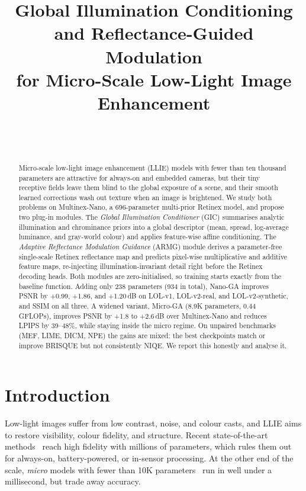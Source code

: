 \documentclass[10pt,twocolumn,letterpaper]{article}
\title{Global Illumination Conditioning and Reflectance-Guided Modulation\\for Micro-Scale Low-Light Image Enhancement}
\author{\todo{Author names} \\ \todo{Affiliation} \\ {\tt\small \todo{email}}}
\date{}
\begin{document}
\maketitle

\begin{abstract}
Micro-scale low-light image enhancement (LLIE) models with fewer than ten thousand
parameters are attractive for always-on and embedded cameras, but their tiny
receptive fields leave them blind to the global exposure of a scene, and their
smooth learned corrections wash out texture when an image is brightened. We study
both problems on Multinex-Nano, a 696-parameter multi-prior Retinex model, and propose
two plug-in modules. The \emph{Global Illumination Conditioner} (GIC) summarises
analytic illumination and chrominance priors into a global descriptor (mean,
spread, log-average luminance, and gray-world colour) and applies feature-wise
affine conditioning. The \emph{Adaptive Reflectance Modulation Guidance} (ARMG) module
derives a parameter-free single-scale Retinex reflectance map and predicts
pixel-wise multiplicative and additive feature maps, re-injecting
illumination-invariant detail right before the Retinex decoding heads. Both
modules are zero-initialised, so training starts exactly from the baseline
function. Adding only 238 parameters (934 in total), Nano-GA improves PSNR by
+0.99, +1.86, and +1.20\,dB on LOL-v1, LOL-v2-real, and LOL-v2-synthetic, and SSIM
on all three. A widened variant, Micro-GA (8.9K parameters, 0.44\,GFLOPs), improves
PSNR by +1.8 to +2.6\,dB over Multinex-Nano and reduces LPIPS by 39--48\%,
while staying inside the micro regime. On unpaired benchmarks (MEF, LIME, DICM, NPE)
the gains are mixed: the best checkpoints match or improve BRISQUE but not
consistently NIQE. We report this honestly and analyse it.
\end{abstract}

\section{Introduction}
Low-light images suffer from low contrast, noise, and colour casts, and LLIE
aims to restore visibility, colour fidelity, and structure. Recent
state-of-the-art methods~\cite{cai2023retinexformer,yan2025hvi} reach high fidelity
with millions of parameters, which rules them out for always-on, battery-powered,
or in-sensor processing. At the other end of the scale, \emph{micro} models with
fewer than 10K parameters~\cite{ma2022sci,liu2021ruas,ouyang2023rsfnet,brateanu2026multinex}
run in well under a millisecond, but trade away accuracy.
\end{document}
